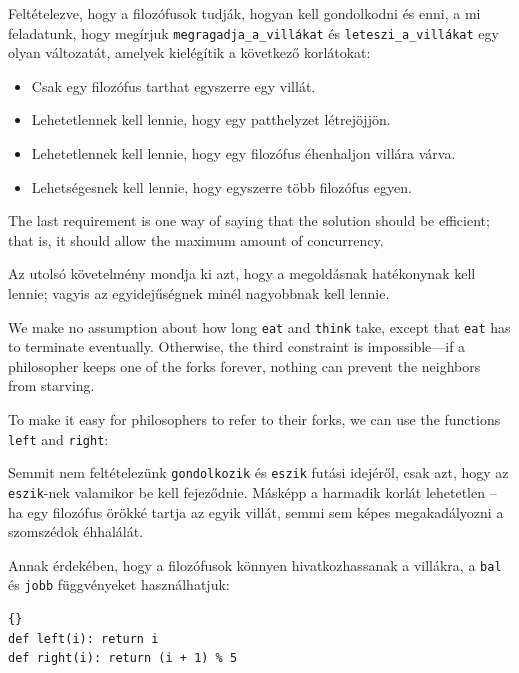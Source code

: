\documentclass{book}
\begin{document}
Feltételezve, hogy a filozófusok tudják, hogyan kell gondolkodni
és enni, a mi feladatunk, hogy megírjuk {\tt megragadja\_a\_villákat} és
{\tt leteszi\_a\_villákat} egy olyan változatát, amelyek kielégítik a
következő korlátokat:

\begin{itemize}

\item Csak egy filozófus tarthat egyszerre egy villát.

\item Lehetetlennek kell lennie, hogy egy patthelyzet létrejöjjön.

\item Lehetetlennek kell lennie, hogy egy filozófus éhenhaljon villára várva.

\item Lehetségesnek kell lennie, hogy egyszerre több filozófus egyen.

\end{itemize}

The last requirement is one way of saying that the solution
should be efficient; that is, it should allow the maximum amount
of concurrency.

Az utolsó követelmény mondja ki azt, hogy a megoldásnak hatékonynak kell
lennie; vagyis az egyidejűségnek minél nagyobbnak kell lennie.

We make no assumption about how long {\tt eat} and {\tt think} take,
except that {\tt eat} has to terminate eventually.  Otherwise, the
third constraint is impossible---if a philosopher keeps one of the
forks forever, nothing can prevent the neighbors from starving.

To make it easy for philosophers to refer to their forks,
we can use the functions {\tt left} and {\tt right}:

Semmit nem feltételezünk {\tt gondolkozik} és {\tt eszik} futási idejéről,
csak azt, hogy az {\tt eszik}-nek valamikor be kell fejeződnie. Másképp
a harmadik korlát lehetetlen -- ha egy filozófus örökké tartja az
egyik villát, semmi sem képes megakadályozni a szomszédok éhhalálát.

Annak érdekében, hogy a filozófusok könnyen hivatkozhassanak a villákra,
a {\tt bal} és {\tt jobb} függvényeket használhatjuk:

\begin{lstlisting}[title={Which fork?}]{}
def left(i): return i
def right(i): return (i + 1) % 5
\end{lstlisting}
\end{document}
